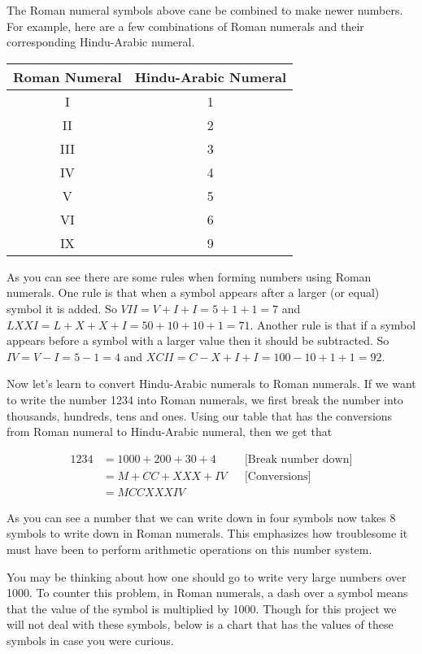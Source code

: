 \documentclass{article}
\begin{document}
The Roman numeral symbols above cane be combined to make newer numbers. For example, here are a few combinations of Roman numerals and their corresponding Hindu-Arabic numeral.

\begin{center}
\begin{tabular}{||c c||} 
 \hline
 Roman Numeral & Hindu-Arabic Numeral \\ [0.5ex] 
 \hline
 I & 1 \\
 \hline
 II & 2 \\
 \hline
 III & 3 \\
 \hline
 IV & 4 \\
 \hline
 V & 5 \\ 
 \hline
 VI & 6 \\ 
 \hline
 IX &9 \\
 \hline
\end{tabular}
\end{center}

As you can see there are some rules when forming numbers using Roman numerals. One rule is that when a symbol appears after a larger (or equal) symbol it is added\cite{16}. So $VII = V + I + I = 5 + 1 + 1 = 7$ and $LXXI = L + X + X + I = 50 + 10 + 10 + 1 = 71$. Another rule is that if a symbol appears before a symbol with a larger value then it should be subtracted\cite{16}. So $IV = V - I = 5 - 1 = 4$ and $XCII = C - X + I + I = 100 - 10 + 1 + 1 = 92$. 


Now let's learn to convert Hindu-Arabic numerals to Roman numerals. If we want to write the number 1234 into Roman numerals, we first break the number into thousands, hundreds, tens and ones. Using our table that has the conversions from Roman numeral to Hindu-Arabic numeral, then we get that

\begin{align*}
    1234 &= 1000 + 200 + 30 + 4 &&\text{[Break number down]} \\
    &= M + CC + XXX + IV &&\text{[Conversions]} \\
    &= MCCXXXIV
\end{align*}

As you can see a  number that we can write down in four symbols now takes 8 symbols to write down in Roman numerals. This emphasizes how troublesome it must have been to perform arithmetic operations on this number system. 

\vspace{\baselineskip}
You may be thinking about how one should go to write very large numbers over 1000. To counter this problem, in Roman numerals, a dash over a symbol means that the value of the symbol is multiplied by 1000. Though for this project we will not deal with these symbols, below is a chart that has the values of these symbols in case you were curious.
\end{document}
